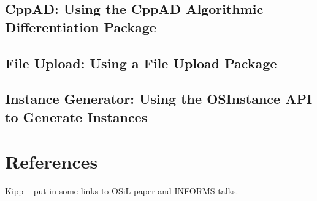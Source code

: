 \documentclass[11pt]{article}
\newcommand{\bibpath}{/home/kmartin/files/misc}
\renewcommand{\_}{{\char"5F}}
\renewcommand{\{}{{\char"7B}}
\renewcommand{\}}{{\char"7D}}
\renewcommand{\^}{{\char"0D}}
\renewcommand{\'}{{\char"0D}}
\begin{document}
\subsection{CppAD:  Using the CppAD Algorithmic Differentiation Package}\label{section:cppad}

\subsection{File Upload:  Using a File Upload Package}\label{section:fileupload}

\subsection{Instance Generator: Using the OSInstance API to Generate Instances}\label{subsection:exampleOSInstance}

\section{References}

Kipp -- put in some links to OSiL paper and INFORMS talks.

\end{document}
